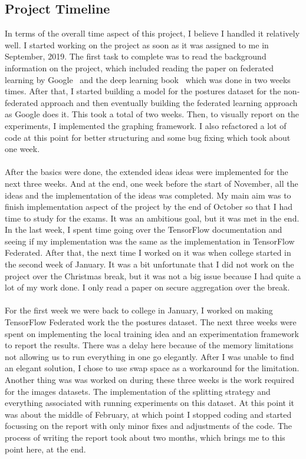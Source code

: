 \documentclass[12pt]{article}
\newcommand{\comment}[1]{}
\begin{document}
\subsection{Project Timeline}
\comment{
	reglection subsection
		what did I learn, new skills, short comings (skill, method, time)
	summary of project conduction
		timeline 
}
In terms of the overall time aspect of this project, I believe I handled it relatively well. I started working on the project as soon as it was assigned to me in September, 2019. The first task to complete was to read the background information on the project, which included reading the paper on federated learning by Google~\cite{mcmahan2016communication} and the deep learning book~\cite{deeplearning} which was done in two weeks times. After that, I started building a model for the postures dataset for the non-federated approach and then eventually building the federated learning approach as Google does it. This took a total of two weeks. Then, to visually report on the experiments, I implemented the graphing framework. I also refactored a lot of code at this point for better structuring and some bug fixing which took about one week.
\\\\
After the basics were done, the extended ideas ideas were implemented for the next three weeks. And at the end, one week before the start of November, all the ideas and the implementation of the ideas was completed. My main aim was to finish implementation aspect of the project by the end of October so that I had time to study for the exams. It was an ambitious goal, but it was met in the end. In the last week, I spent time going over the TensorFlow documentation and seeing if my implementation was the same as the implementation in TensorFlow Federated. After that, the next time I worked on it was when college started in the second week of January. It was a bit unfortunate that I did not work on the project over the Christmas break, but it was not a big issue because I had quite a lot of my work done. I only read a paper on secure aggregation over the break.
\\\\
For the first week we were back to college in January, I worked on making TensorFlow Federated work the the postures dataset. The next three weeks were spent on implementing the local training idea and an experimentation framework to report the results. There was a delay here because of the memory limitations not allowing us to run everything in one go elegantly. After I was unable to find an elegant solution, I chose to use swap space as a workaround for the limitation. Another thing was was worked on during these three weeks is the work required for the images datasets. The implementation of the splitting strategy and everything associated with running experiments on this dataset. At this point it was about the middle of February, at which point I stopped coding and started focussing on the report with only minor fixes and adjustments of the code. The process of writing the report took about two months, which brings me to this point here, at the end.
\comment{
	basic thing
	read book
	google implementation
	better graphinh 
	extended ideas
	repreodcuible
	testing
	results
	report - 2 months 
}
\clearpage
\printbibliography[title={Bibliography}]
\end{document}
